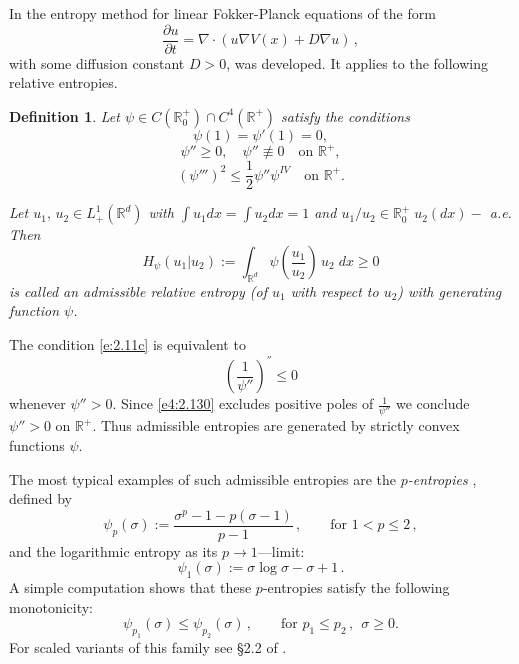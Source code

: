 \documentclass[reqno]{amsart}
\newtheorem{definition}[lemma]{Definition}
\newcommand{\R}{\mathbb{R}}
\newcommand{\Rd}{{\R^d}}
\newcommand{\intRd}{{\int_\Rd}}
\newcommand{\be}{\begin{equation}}
\newcommand{\ee}{\end{equation}}
\begin{document}
In \cite{BaEm84, AMTU} the entropy method for linear Fokker-Planck equations of the form 
\be\label{linFP}
  \frac{\partial u}{\partial t} = \nabla\cdot(u\nabla V(x)+D\nabla u)\,,
\ee
with some diffusion constant $D>0$, was developed. It applies to the following relative entropies.

\begin{definition}
\label{d:2.1}
Let $\psi\in C({\R^+_0})\cap C^4(\R^+)$
satisfy the conditions
\begin{equation*}
  \psi(1)=\psi'(1)=0,
\end{equation*}
\begin{equation*}
  \psi''\ge 0, \quad\psi''\not\equiv 0\quad\mbox{on } \R^+,
\end{equation*}
\begin{equation}
  \label{e:2.11c}
  (\psi''')^2\le\frac12 \psi''\psi^{IV}\quad\mbox{on } \R^+.
\end{equation}

Let $u_1,\,u_2 \in L^1_+(\Rd)$ with $\int u_1dx=\int u_2dx=1$
and
$u_1/u_2\in {\R^+_0} \;u_2(dx)-$ a.e.
Then
\begin{equation}
  \label{e:2.12}
   H_\psi(u_1|u_2):=\intRd\psi\left(\frac{u_1}{u_2}\right)\,u_2\;dx \ge0
\end{equation}
is called an \emph {admissible relative entropy} (of $u_1$ with respect
to $u_2$) with {\em generating function} $\psi$.
\end{definition}

The condition \eqref{e:2.11c} is equivalent to
\begin{equation}
 \label{e4:2.130}
 \left( \frac 1{\psi''}\right)^{''} \le 0
\end{equation}
whenever $\psi''>0$. Since \eqref{e4:2.130} excludes positive poles of $\frac 1{\psi''}$ we conclude $\psi''>0$ on $\R^+$. Thus admissible entropies are generated by strictly convex functions $\psi$.

The most typical examples of such admissible entropies are the \emph{$p$-entropies} \cite{AMTU, Bec89}, defined by
\begin{equation}\label{psi-p}
  \psi_p(\sigma):=\frac{\sigma^p-1-p(\sigma-1)}{p-1}\,,\qquad\mbox{for } 1<p\le2\,,
\end{equation}
and the logarithmic entropy as its $p\to1$---limit:
$$
  \psi_1(\sigma):=\sigma\log\sigma-\sigma+1\,.
$$
A simple computation shows that these $p$-entropies satisfy the following monotonicity:
$$
  \psi_{p_1}(\sigma)\le \psi_{p_2}(\sigma)\,,\qquad\mbox{for } p_1\le p_2\,, \:\:\sigma\ge0.
$$
For scaled variants of this family see \S2.2 of \cite{AMTU}.\\
\end{document}
